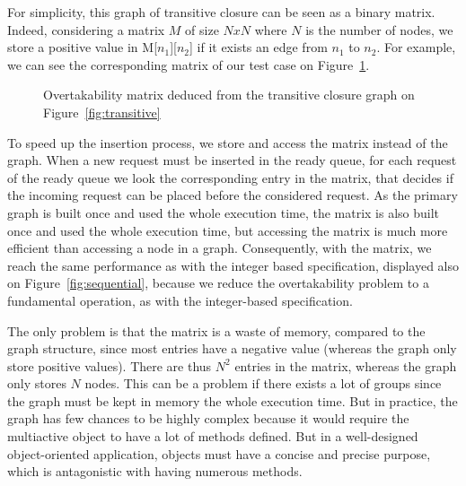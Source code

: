 \documentclass[11pt]{report}
\begin{document}
For simplicity, this graph of transitive closure can be seen as a binary matrix. Indeed, considering a matrix $M$ of size $NxN$ where $N$ is the number of nodes, we store a positive value in M[$n_1$][$n_2$] if it exists an edge from $n_1$ to $n_2$. For example, we can see the corresponding matrix of our test case on Figure~\ref{fig:matrix}.
\begin{figure}[!ht]
      \caption{Overtakability matrix deduced from the transitive closure graph on Figure~\ref{fig:transitive}}
      \label{fig:matrix} 
\end{figure}
To speed up the insertion process, we store and access the matrix instead of the graph. When a new request must be inserted in the ready queue, for each request of the ready queue we look the corresponding entry in the matrix, that decides if the incoming request can be placed before the considered request. 
As the primary graph is built once and used the whole execution time, the matrix is also built once and used the whole execution time, but accessing the matrix is much more efficient than accessing a node in a graph.
Consequently, with the matrix, we reach the same performance as with the integer based specification, displayed also on Figure~\ref{fig:sequential}, because we reduce the overtakability problem to a fundamental operation, as with the integer-based specification.

The only problem is that the matrix is a waste of memory, compared to the graph structure, since most entries have a negative value (whereas the graph only store positive values). There are thus $N^2$ entries in the matrix, whereas the graph only stores $N$ nodes. This can be a problem if there exists a lot of groups since the graph must be kept in memory the whole execution time.
But in practice, the graph has few chances to be highly complex because it would require the multiactive object to have a lot of methods defined. But in a well-designed object-oriented application, objects must have a concise and precise purpose, which is antagonistic with having numerous methods. 
\end{document}
